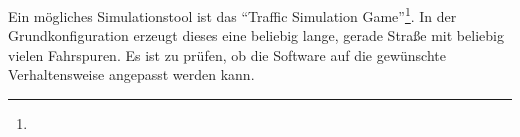 Ein mögliches Simulationstool ist das \enquote{Traffic Simulation Game}\footnote{}. 
In der Grundkonfiguration erzeugt dieses eine beliebig lange, gerade Straße mit beliebig vielen Fahrspuren. 
Es ist zu prüfen, ob die Software auf die gewünschte Verhaltensweise angepasst werden kann.